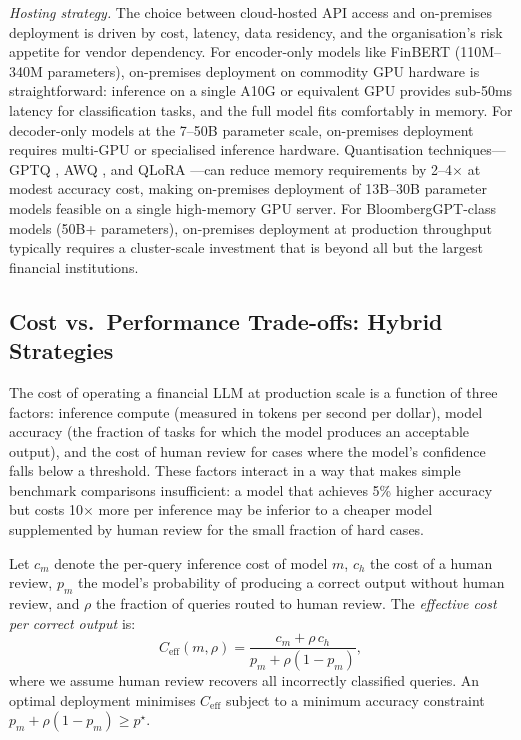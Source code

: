 \textit{Hosting strategy.}  The choice between cloud-hosted API access and
on-premises deployment is driven by cost, latency, data residency, and the
organisation's risk appetite for vendor dependency.  For encoder-only models
like FinBERT (110M--340M parameters), on-premises deployment on commodity GPU
hardware is straightforward: inference on a single A10G or equivalent GPU provides
sub-50ms latency for classification tasks, and the full model fits comfortably in
memory.  For decoder-only models at the 7--50B parameter scale, on-premises
deployment requires multi-GPU or specialised inference hardware.  Quantisation
techniques---GPTQ \cite{frantar2022gptq}, AWQ \cite{lin2023awq}, and
QLoRA \cite{dettmers2023qlora}---can reduce memory requirements by 2--4$\times$
at modest accuracy cost, making on-premises deployment of 13B--30B parameter
models feasible on a single high-memory GPU server.  For BloombergGPT-class
models (50B+ parameters), on-premises deployment at production throughput
typically requires a cluster-scale investment that is beyond all but the largest
financial institutions.

\subsection{Cost vs.\ Performance Trade-offs: Hybrid Strategies}
\label{sec:ch08-cost-performance}

The cost of operating a financial LLM at production scale is a function of three
factors: inference compute (measured in tokens per second per dollar), model
accuracy (the fraction of tasks for which the model produces an acceptable output),
and the cost of human review for cases where the model's confidence falls below
a threshold.  These factors interact in a way that makes simple benchmark
comparisons insufficient: a model that achieves 5\% higher accuracy but costs
10$\times$ more per inference may be inferior to a cheaper model supplemented
by human review for the small fraction of hard cases.

\begin{definition}
\label{def:ch08-effective-cost}
Let $c_m$ denote the per-query inference cost of model $m$, $c_h$ the cost
of a human review, $p_m$ the model's probability of producing a correct output
without human review, and $\rho$ the fraction of queries routed to human review.
The \emph{effective cost per correct output} is:
\begin{equation}
  C_{\mathrm{eff}}(m, \rho) = \frac{c_m + \rho \, c_h}{p_m + \rho(1 - p_m)},
  \label{eq:ch08-effective-cost}
\end{equation}
where we assume human review recovers all incorrectly classified queries.
An optimal deployment minimises $C_{\mathrm{eff}}$ subject to a minimum accuracy
constraint $p_m + \rho(1-p_m) \geq p^\star$.
\end{definition}

